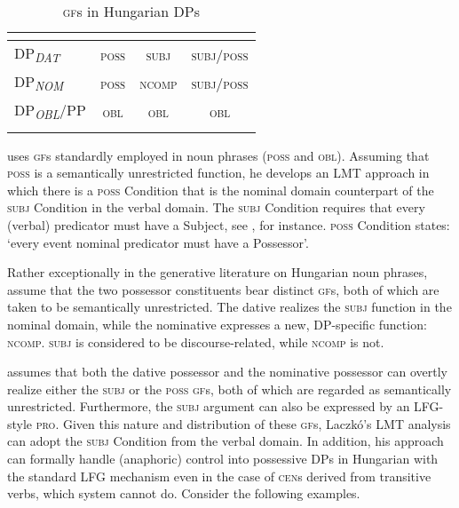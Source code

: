 \documentclass[output=paper,hidelinks]{langscibook}
\begin{document}
\begin{table}
\begin{tabularx}{\textwidth}{Xccc}
\lsptoprule
& {\citet{Laczko95}} & {\citet{ChisaPayn03}} & {\citet{Laczko2004}}\\\midrule
DP\textit{\textsubscript{DAT}} & \textsc{poss} & \textsc{subj} & \textsc{subj/poss}\\
DP\textit{\textsubscript{NOM}} & \textsc{poss} & \textsc{ncomp} & \textsc{subj/poss}\\
DP\textit{\textsubscript{OBL}}/PP & \textsc{obl} & \textsc{obl} & \textsc{obl}\\
\lspbottomrule
\end{tabularx}
\caption{\textsc{gf}s in Hungarian DPs}
\label{tab:FinnoUgric:6}
\end{table}

\citet{Laczko95} uses \textsc{gf}s standardly employed in noun phrases (\textsc{poss} and \textsc{obl}). Assuming that \textsc{poss} is a semantically unrestricted function, he develops an LMT approach in which there is a \textsc{poss} Condition that is the nominal domain counterpart of the \textsc{subj} Condition in the verbal domain. The \textsc{subj} Condition requires that every (verbal) predicator must have a Subject, see \citet{Bresnan:Monotonicity}, for instance.  \textsc{poss} Condition states: `every event nominal predicator must have a Possessor'.

Rather exceptionally in the generative literature on Hungarian noun phrases, \citet{ChisaPayn03} assume that the two possessor constituents bear distinct \textsc{gf}s, both of which are taken to be semantically unrestricted. The dative realizes the \textsc{subj} function in the nominal domain, while the nominative expresses a new, DP-specific function: \textsc{ncomp}. \textsc{subj} is considered to be discourse-related, while \textsc{ncomp} is not. 

\citet{Laczko2004} assumes that both the dative possessor and the nominative possessor can overtly realize either the \textsc{subj} or the \textsc{poss} \textsc{gf}s, both of which are regarded as semantically unrestricted. Furthermore, the \textsc{subj} argument can also be expressed by an LFG{}-style \textsc{pro}. Given this nature and distribution of these \textsc{gf}s, Laczkó's LMT analysis can adopt the \textsc{subj} Condition from the verbal domain. In addition, his approach can formally handle (anaphoric) control into possessive DPs in Hungarian with the standard LFG mechanism even in the case of \textsc{cen}s derived from transitive verbs, which  system cannot do. Consider the following examples.
\end{document}
